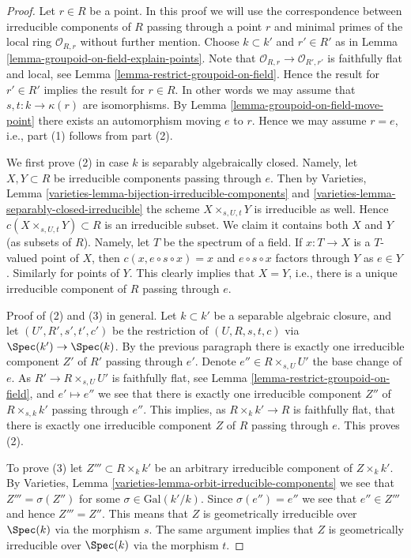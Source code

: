 \begin{proof}
Let $r \in R$ be a point.
In this proof we will use the correspondence between irreducible components
of $R$ passing through a point $r$ and minimal primes of the local
ring $\mathcal{O}_{R, r}$ without further mention.
Choose $k \subset k'$ and $r' \in R'$ as in
Lemma \ref{lemma-groupoid-on-field-explain-points}.
Note that $\mathcal{O}_{R, r} \to \mathcal{O}_{R', r'}$
is faithfully flat and local, see
Lemma \ref{lemma-restrict-groupoid-on-field}.
Hence the result for $r' \in R'$ implies the result for $r \in R$.
In other words we may assume that $s, t : k \to \kappa(r)$
are isomorphisms. By
Lemma \ref{lemma-groupoid-on-field-move-point}
there exists an automorphism moving $e$ to $r$.
Hence we may assume $r = e$, i.e., part (1) follows from part (2).

\medskip\noindent
We first prove (2) in case $k$ is separably algebraically closed.
Namely, let $X, Y \subset R$ be irreducible components
passing through $e$. Then by
Varieties, Lemma \ref{varieties-lemma-bijection-irreducible-components} and
\ref{varieties-lemma-separably-closed-irreducible}
the scheme $X \times_{s, U, t} Y$ is irreducible as well.
Hence $c(X \times_{s, U, t} Y) \subset R$ is an irreducible subset.
We claim it contains both $X$ and $Y$ (as subsets of $R$).
Namely, let $T$ be the spectrum of a field. If $x : T \to X$ is a $T$-valued
point of $X$, then $c(x, e \circ s \circ x) = x$ and $e \circ s \circ x$
factors through $Y$ as $e \in Y$. Similarly for points of $Y$.
This clearly implies that $X = Y$, i.e., there is a unique irreducible
component of $R$ passing through $e$.

\medskip\noindent
Proof of (2) and (3) in general.
Let $k \subset k'$ be a separable algebraic closure, and
let $(U', R', s', t', c')$ be the restriction of
$(U, R, s, t, c)$ via $\Spec(k') \to \Spec(k)$.
By the previous paragraph there is exactly one irreducible
component $Z'$ of $R'$ passing through $e'$.
Denote $e'' \in R \times_{s, U} U'$ the base change of $e$.
As $R' \to R \times_{s, U} U'$ is faithfully flat, see
Lemma \ref{lemma-restrict-groupoid-on-field},
and $e' \mapsto e''$ we see that there is exactly one
irreducible component $Z''$ of $R \times_{s, k} k'$ passing
through $e''$. This implies, as $R \times_k k' \to R$ is faithfully
flat, that there is exactly one irreducible component $Z$ of $R$
passing through $e$. This proves (2).

\medskip\noindent
To prove (3) let $Z''' \subset R \times_k k'$ be an arbitrary
irreducible component of $Z \times_k k'$. By
Varieties, Lemma \ref{varieties-lemma-orbit-irreducible-components}
we see that $Z''' = \sigma(Z'')$ for some $\sigma \in \text{Gal}(k'/k)$.
Since $\sigma(e'') = e''$ we see that $e'' \in Z'''$ and hence
$Z''' = Z''$. This means that $Z$ is geometrically irreducible
over $\Spec(k)$ via the morphism $s$.
The same argument implies that $Z$ is geometrically irreducible
over $\Spec(k)$ via the morphism $t$.
\end{proof}

